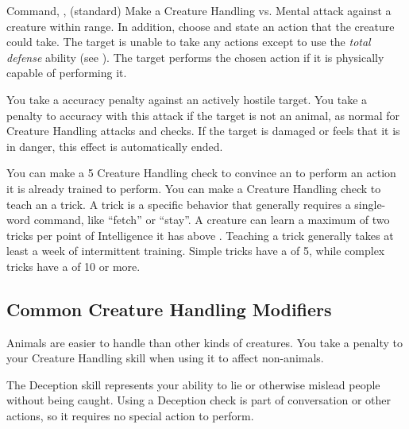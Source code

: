         \begin{sustainability}{Command}{, ,  (standard)}
            \label{Command}
            Make a Creature Handling vs. Mental attack against a creature within \rngmed range.
            In addition, choose and state an action that the creature could take.
            \hit The target is unable to take any actions except to use the \textit{total defense} ability (see ).
            \crit The target performs the chosen action if it is physically capable of performing it.
            
            You take a  accuracy penalty against an actively hostile target.
            You take a  penalty to accuracy with this attack if the target is not an animal, as normal for Creature Handling attacks and checks.
            If the target is damaged or feels that it is in danger, this effect is automatically ended.
        \end{sustainability}
         You can make a  5 Creature Handling check to convince an  to perform an action it is already trained to perform.
         You can make a Creature Handling check to teach an  a trick.
        A trick is a specific behavior that generally requires a single-word command, like ``fetch'' or ``stay''.
        A creature can learn a maximum of two tricks per point of Intelligence it has above .
        Teaching a trick generally takes at least a week of intermittent training.
        Simple tricks have a  of 5, while complex tricks have a  of 10 or more.

    \subsection{Common Creature Handling Modifiers}
        Animals are easier to handle than other kinds of creatures.
        You take a  penalty to your Creature Handling skill when using it to affect non-animals.

\newpage
{}
        The Deception skill represents your ability to lie or otherwise mislead people without being caught.
        Using a Deception check is part of conversation or other actions, so it requires no special action to perform.

